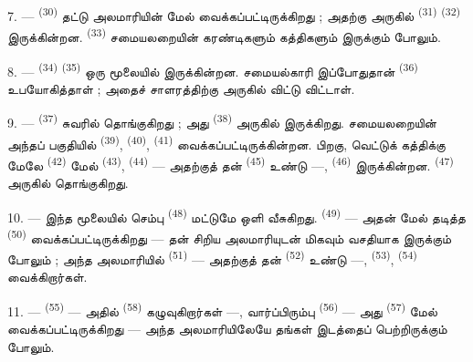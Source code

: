 7. ---  \textsuperscript{(30)} தட்டு அலமாரியின் மேல்
வைக்கப்பட்டிருக்கிறது ; அதற்கு அருகில் 
\textsuperscript{(31)} 
\textsuperscript{(32)} இருக்கின்றன. 
\textsuperscript{(33)} சமையலறையின் கரண்டிகளும் கத்திகளும்
இருக்கும் போலும்.

8. ---  \textsuperscript{(34)}  \textsuperscript{(35)} ஒரு மூலையில் இருக்கின்றன.
சமையல்காரி இப்போதுதான்  \textsuperscript{(36)}
உபயோகித்தாள் ; அதைச் சாளரத்திற்கு அருகில் விட்டு விட்டாள்.

9. ---  \textsuperscript{(37)} சுவரில்
தொங்குகிறது ; அது  \textsuperscript{(38)} அருகில்
இருக்கிறது. சமையலறையின் அந்தப் பகுதியில் 
\textsuperscript{(39)}, 
\textsuperscript{(40)},  \textsuperscript{(41)}
வைக்கப்பட்டிருக்கின்றன. பிறகு, வெட்டுக் கத்திக்கு மேலே
 \textsuperscript{(42)} மேல் 
\textsuperscript{(43)}, 
\textsuperscript{(44)} — அதற்குத் தன் 
\textsuperscript{(45)} உண்டு —, 
\textsuperscript{(46)} இருக்கின்றன. 
\textsuperscript{(47)} அருகில் தொங்குகிறது.

10. --- இந்த மூலையில் செம்பு  \textsuperscript{(48)}
மட்டுமே ஒளி வீசுகிறது.  \textsuperscript{(49)} —
அதன் மேல் தடித்த  \textsuperscript{(50)}
வைக்கப்பட்டிருக்கிறது — தன் சிறிய அலமாரியுடன் மிகவும் வசதியாக
இருக்கும் போலும் ; அந்த அலமாரியில் 
\textsuperscript{(51)} — அதற்குத் தன் 
\textsuperscript{(52)} உண்டு —, 
\textsuperscript{(53)}, 
\textsuperscript{(54)} வைக்கிறார்கள்.

\VUsaut{4.0mm}
\VUsaut{3.0mm}

11. ---  \textsuperscript{(55)} — அதில்
 \textsuperscript{(58)} கழுவுகிறார்கள் —,
வார்ப்பிரும்பு  \textsuperscript{(56)} — அது
 \textsuperscript{(57)} மேல்
வைக்கப்பட்டிருக்கிறது — அந்த அலமாரியிலேயே தங்கள் இடத்தைப்
பெற்றிருக்கும் போலும்.

